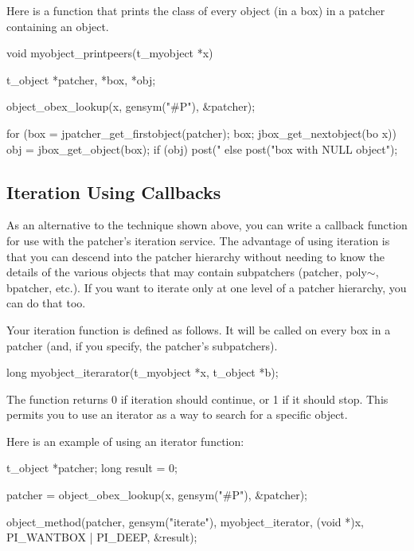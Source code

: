 Here is a function that prints the class of every object (in a box) in a patcher containing an object. 
\begin{DoxyCode}
    void myobject_printpeers(t_myobject *x)
    {
        t_object *patcher, *box, *obj;

        object_obex_lookup(x, gensym("#P"), &patcher);

        for (box = jpatcher_get_firstobject(patcher); box; jbox_get_nextobject(bo
      x)) {
            obj = jbox_get_object(box);
            if (obj)
                post("%
            else
                post("box with NULL object");
        }
    }
\end{DoxyCode}
\hypertarget{chapter_scripting_chapter_scripting_knowing_iteration}{}\subsection{Iteration Using Callbacks}\label{chapter_scripting_chapter_scripting_knowing_iteration}
As an alternative to the technique shown above, you can write a callback function for use with the patcher's iteration service. The advantage of using iteration is that you can descend into the patcher hierarchy without needing to know the details of the various objects that may contain subpatchers (patcher, poly$\sim$, bpatcher, etc.). If you want to iterate only at one level of a patcher hierarchy, you can do that too.

Your iteration function is defined as follows. It will be called on every box in a patcher (and, if you specify, the patcher's subpatchers). 
\begin{DoxyCode}
     long myobject_iterarator(t_myobject *x, t_object *b);
\end{DoxyCode}


The function returns 0 if iteration should continue, or 1 if it should stop. This permits you to use an iterator as a way to search for a specific object.

Here is an example of using an iterator function:


\begin{DoxyCode}
        t_object *patcher;
        long result = 0;

        patcher = object_obex_lookup(x, gensym("#P"), &patcher);

        object_method(patcher, gensym("iterate"), myobject_iterator, (void *)x, 
      PI_WANTBOX | PI_DEEP, &result);
\end{DoxyCode}


